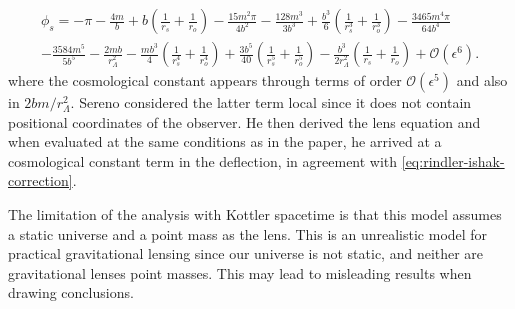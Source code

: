 \begin{equation}
  \begin{aligned}
  \phi_s = -\pi  - \frac{4m}{b} + b \left ( \frac{1}{r_s} + \frac{1}{r_o}\right ) - \frac{15 m^2 \pi}{4b^2} - \frac{128m^3}{3b^3} + \frac{b^3}{6} \left ( \frac{1}{r_s^3} + \frac{1}{r_o^3} \right ) - \frac{3465m^4 \pi}{64b^4} \\ - \frac{3584m^5}{5b^5} - \frac{2mb}{r_{\Lambda}^2} - \frac{mb^3}{4} \left ( \frac{1}{r_s^4} + \frac{1}{r_o^4}\right ) + \frac{3b^5}{40} \left ( \frac{1}{r_s^5} + \frac{1}{r_o^5} \right ) - \frac{b^3}{2r^2_{\Lambda}} \left ( \frac{1}{r_s} + \frac{1}{r_o} \right ) + \mathcal{O}(\epsilon^6).
  \end{aligned}
  \label{eq:sereno-2}
\end{equation}
where the cosmological constant appears through terms of order $\mathcal{O}(\epsilon^5)$ and also in $2bm/ r_{\Lambda}^2$. Sereno considered the latter term local since it does not contain positional coordinates of the observer. He then derived the lens equation and when evaluated at the same conditions as in the \citet{Rindler2007} paper, he arrived at a cosmological constant term in the deflection, in agreement with \eqref{eq:rindler-ishak-correction}. 

The limitation of the analysis with Kottler spacetime is that this model assumes a static universe and a point mass as the lens. This is an unrealistic model for practical gravitational lensing since our universe is not static, and neither are gravitational lenses point masses. This may lead to misleading results when drawing conclusions. 
